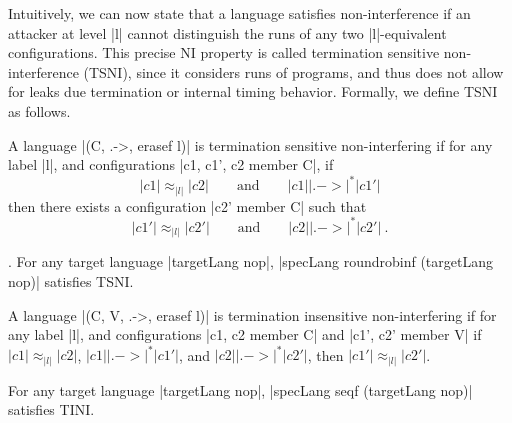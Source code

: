 Intuitively, we can now state that a language satisfies non-interference if an
attacker at level |l| cannot distinguish the runs of any two |l|-equivalent
configurations.
%
This precise NI property is called termination sensitive non-interference
(TSNI), since it considers runs of programs, and thus does not allow for leaks
due termination or internal timing behavior.
%
Formally, we define TSNI as follows.

\begin{definition}
  A language |(C, .->, erasef l)| is termination
  sensitive non-interfering if for any label |l|, and configurations
  |c1, c1', c2 member C|, if
  \begin{equation} \label{eq:tsni-lhs}
    |c1| \approx_{|l|} |c2|
    \qquad \text{and} \qquad
    |c1| |.->|^* |c1'|
  \end{equation}
  then there exists a configuration |c2' member C| such that
  \begin{equation} \label{eq:tsni-rhs}
    |c1'| \approx_{|l|} |c2'|
     \qquad \text{and} \qquad
    |c2| |.->|^* |c2'|
    \ \text{.}
  \end{equation}
\end{definition}

\begin{theorem}.
  \label{thm:rr-tsni}
For any target language |targetLang nop|, |specLang roundrobinf
(targetLang nop)| satisfies TSNI.
\end{theorem}

\begin{definition}
  A language |(C, V, .->, erasef l)| is termination
  insensitive non-interfering if for any label |l|, and configurations
  |c1, c2 member C| and |c1', c2' member V| if
   $|c1| \approx_{|l|} |c2|$,
   $|c1| |.->|^* |c1'|$, and
   $|c2| |.->|^* |c2'|$, then
   $|c1'| \approx_{|l|} |c2'|$.
\end{definition}


\begin{theorem}
For any target language |targetLang nop|, |specLang seqf (targetLang
nop)| satisfies TINI.
\end{theorem}




